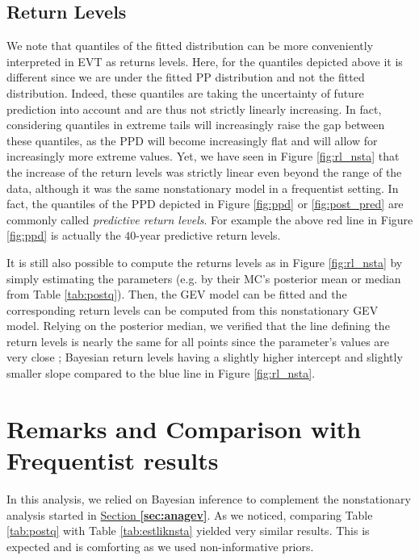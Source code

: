 \subsection{Return Levels}


We note that quantiles of the fitted distribution can be more conveniently interpreted in EVT as returns levels. 
 Here, for the quantiles depicted above it is different since we are under the fitted PP distribution and not the fitted distribution. Indeed, these quantiles are taking the uncertainty of future prediction into account and are thus not strictly linearly increasing. In fact, considering quantiles in extreme tails will increasingly raise the gap between these quantiles, as the PPD will become increasingly flat and will allow for increasingly more extreme values. Yet, we have seen in Figure \ref{fig:rl_nsta} that the increase of the return levels was strictly linear even beyond the range of the data, although it was the same nonstationary model in a frequentist setting.
In fact, the quantiles of the PPD depicted in Figure \ref{fig:ppd} or \ref{fig:post_pred} are commonly called \emph{predictive return levels}. For example the above red line in Figure \ref{fig:ppd} is actually the $40$-year predictive return levels.

It is still also possible to compute the returns levels as in Figure \ref{fig:rl_nsta} by simply estimating the parameters (e.g. by their MC's posterior mean or median from Table \ref{tab:postq}). Then, the GEV model can be fitted and the corresponding return levels can be computed from this nonstationary GEV model. Relying on the posterior median, we verified that the line defining the return levels is nearly the same for all points since the parameter's values are very close ; Bayesian return levels having a slightly higher intercept and slightly smaller slope compared to the blue line in Figure \ref{fig:rl_nsta}. 


\section{Remarks and Comparison with Frequentist results}\label{sec:rem}


In this analysis, we relied on Bayesian inference to complement the nonstationary analysis started in \hyperref[sec:anagev]{Section \textbf{\ref{sec:anagev}}}. 
As we noticed, comparing Table \ref{tab:postq} with Table \ref{tab:estliknsta} yielded very similar results. This is expected and is comforting as we used non-informative priors.

